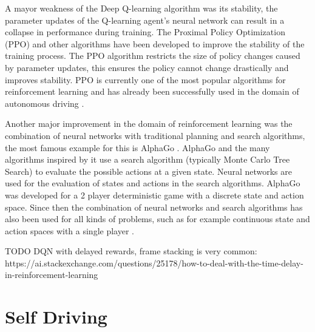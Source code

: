A mayor weakness of the Deep Q-learning algorithm was its stability, the parameter updates of the Q-learning agent's neural network can result in a collapse in performance during training. The Proximal Policy Optimization (PPO) and other algorithms have been developed to improve the stability of the training process. The PPO \autocite{ppo} algorithm restricts the size of policy changes caused by parameter updates, this ensures the policy cannot change drastically and improves stability. PPO is currently one of the most popular algorithms for reinforcement learning and has already been successfully used in the domain of autonomous driving \autocite{maximilian}.


Another major improvement in the domain of reinforcement learning was the combination of neural networks with traditional planning and search algorithms, the most famous example for this is AlphaGo \autocite{alphago}. AlphaGo and the many algorithms inspired by it use a search algorithm (typically Monte Carlo Tree Search) to evaluate the possible actions at a given state. Neural networks are used for the evaluation of states and actions in the search algorithms. AlphaGo was developed for a 2 player deterministic game with a discrete state and action space. Since then the combination of neural networks and search algorithms has also been used for all kinds of problems, such as for example continuous state and action spaces with a single player \autocite{alphagoimprovementmuzero}.


TODO DQN with delayed rewards, frame stacking is very common:
https://ai.stackexchange.com/questions/25178/how-to-deal-with-the-time-delay-in-reinforcement-learning

\section{Self Driving}

